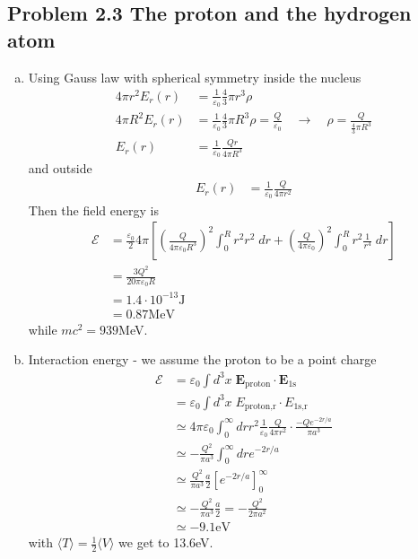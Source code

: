 \documentclass[../main.tex]{subfiles}
\begin{document}
\subsection{Problem 2.3 The proton and the hydrogen atom}
\begin{enumerate}[(a)]
\item Using Gauss law with spherical symmetry inside the nucleus
\begin{align}
4\pi r^2 E_r(r)&=\frac{1}{\varepsilon_0}\frac{4}{3}\pi r^3\rho\\
4\pi R^2 E_r(r)&=\frac{1}{\varepsilon_0}\frac{4}{3}\pi R^3\rho=\frac{Q}{\varepsilon_0}\quad\rightarrow\quad\rho=\frac{Q}{\frac{4}{3}\pi R^3}\\
E_r(r)&=\frac{1}{\varepsilon_0}\frac{Qr}{4\pi R^3}
\end{align}
and outside
\begin{align}
E_r(r)&=\frac{1}{\varepsilon_0}\frac{Q}{4\pi r^2}
\end{align}
Then the field energy is
\begin{align}
\mathscr{E}
&=\frac{\varepsilon_0}{2}4\pi\left[\left(\frac{Q}{4\pi\varepsilon_0 R^3}\right)^2\int_0^Rr^2r^2\;dr+\left(\frac{Q}{4\pi\varepsilon_0}\right)^2\int_0^Rr^2\frac{1}{r^4}\;dr\right]\\
&=\frac{3Q^2}{20\pi\varepsilon_0 R}\\
&=1.4\cdot 10^{-13}\text{J}\\
&=0.87\text{MeV}
\end{align}
while $mc^2=939$MeV.
\item Interaction energy - we assume the proton to be a point charge
\begin{align}
\mathscr{E}
&=\varepsilon_0\int d^3x\; \mathbf{E}_\text{proton}\cdot\mathbf{E}_\text{1s}\\
&=\varepsilon_0\int d^3x\; E_\text{proton,r}\cdot E_\text{1s,r}\\
&\simeq4\pi\varepsilon_0\int_0^\infty dr r^2\frac{1}{\varepsilon_0}\frac{Q}{4\pi r^2}\cdot\frac{-Q e^{-2r/a}}{\pi a^3}\\
&\simeq-\frac{Q^2}{\pi a^3}\int_0^\infty dr e^{-2r/a}\\
&\simeq\frac{Q^2}{\pi a^3}\frac{a}{2} \left[e^{-2r/a}\right]^\infty_0\\
&\simeq-\frac{Q^2}{\pi a^3}\frac{a}{2}=-\frac{Q^2}{2\pi a^2}\\
&\simeq-9.1\text{eV}
\end{align}
with $\langle T\rangle=\frac{1}{2}\langle V\rangle$ we get to 13.6eV.
\end{enumerate}
\end{document}
